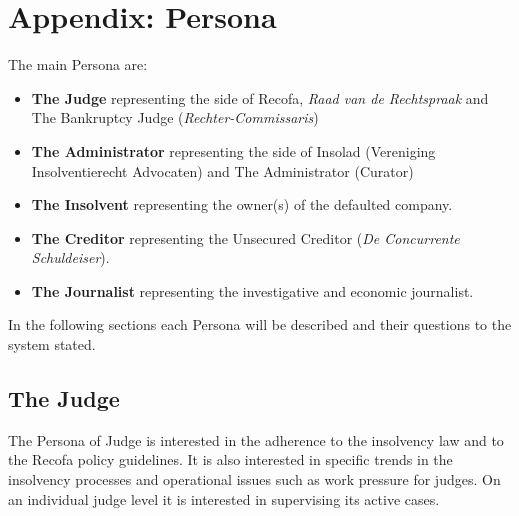 \section{Appendix: Persona}
The main Persona are: 
\begin{itemize}
\item \textbf{The Judge} representing the side of Recofa, \textit{Raad van de Rechtspraak} and The Bankruptcy Judge (\textit{Rechter-Commissaris})
\item \textbf{The Administrator} representing the side of Insolad (Vereniging Insolventierecht Advocaten) and The Administrator (Curator) 
\item \textbf{The Insolvent} representing the owner(s) of the defaulted company.
\item \textbf{The Creditor} representing the Unsecured Creditor (\textit{De Concurrente Schuldeiser}).
\item \textbf{The Journalist} representing the investigative and economic journalist.
\end{itemize}

In the following sections each Persona will be described and their questions to the system stated.

\subsection{The Judge}
The Persona of Judge is interested in the adherence to the insolvency law and to the Recofa policy guidelines. It is also interested in specific trends in the insolvency processes and operational issues such as work pressure for judges. On an individual judge level it is interested in supervising its active cases.

